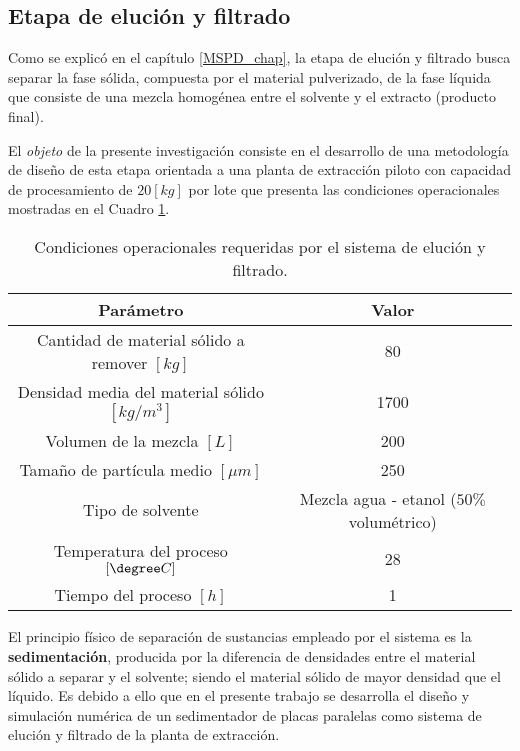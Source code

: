 \begin{center}
	\section{Etapa de eluci\'on y filtrado} \label{teorico:sed}
\end{center}

\noindent
\justify

Como se explic\'o en el cap\'itulo \ref{MSPD_chap}, la etapa de eluci\'on y filtrado busca separar la fase s\'olida, compuesta por el material pulverizado, de la fase l\'iquida que consiste de una mezcla homog\'enea entre el solvente y el extracto (producto final). 

\noindent
\justify

El \textit{objeto} de la presente investigaci\'on consiste en el desarrollo de una metodolog\'ia de dise\~no de esta etapa orientada a una planta de extracci\'on piloto con capacidad de procesamiento de $20 [kg]$ por lote que presenta las condiciones operacionales mostradas en el Cuadro \ref{condiciones}.

\begin{table}[h!]
	\centering
	\begin{tabular}{c|c}
		\hline
		\textbf{Par\'ametro} & \textbf{Valor} \\ \hline
		Cantidad de material s\'olido a remover $[kg]$ & 80 \\ \hline
		Densidad media del material s\'olido $\left[kg / m^3 \right]$ & 1700 \\ \hline
		Volumen de la mezcla $[L]$ & 200 \\ \hline
		Tama\~no de part\'icula medio $[\mu m]$ & 250 \\ \hline
		Tipo de solvente & Mezcla agua - etanol ($50 \%$ volum\'etrico) \\ \hline
		Temperatura del proceso $[\degree C]$ & 28 \\ \hline
		Tiempo del proceso $[h]$ & 1 \\ \hline
		
	\end{tabular}
	\caption{Condiciones operacionales requeridas por el sistema de eluci\'on y filtrado.}
	\label{condiciones}
\end{table}

\noindent
\justify

El principio f\'isico de separaci\'on de sustancias empleado por el sistema es la \textbf{sedimentaci\'on}, producida por la diferencia de densidades entre el material s\'olido a separar y el solvente; siendo el material s\'olido de mayor densidad que el l\'iquido. Es debido a ello que en el presente trabajo se desarrolla el dise\~no y simulaci\'on num\'erica de un sedimentador de placas paralelas como sistema de eluci\'on y filtrado de la planta de extracci\'on.

